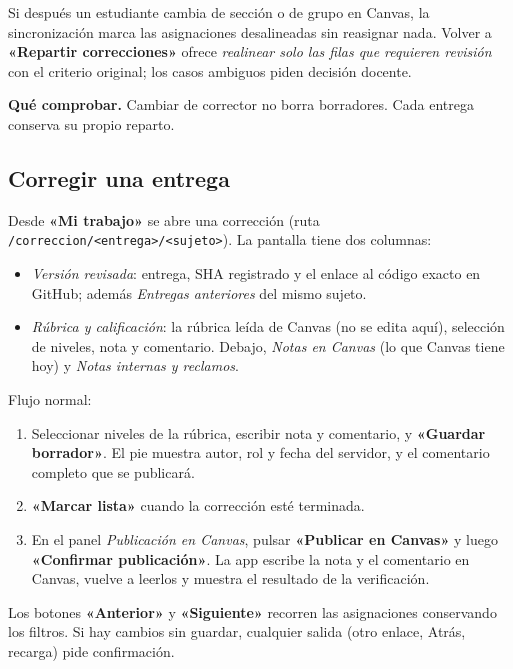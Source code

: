 \documentclass[11pt,a4paper]{article}
\newenvironment{comprobar}
  {\def\FrameCommand{\fcolorbox{verde}{verdefondo}}\MakeFramed{\advance\hsize-\width\FrameRestore}\noindent\textbf{\textcolor{verde}{Qué comprobar.}} }
  {\endMakeFramed}
\newcommand{\ui}[1]{\textbf{«#1»}}        %
\newcommand{\ruta}[1]{\texttt{#1}}        %
\begin{document}
Si después un estudiante cambia de sección o de grupo en Canvas, la sincronización marca las asignaciones desalineadas sin reasignar nada. Volver a \ui{Repartir correcciones} ofrece \emph{realinear solo las filas que requieren revisión} con el criterio original; los casos ambiguos piden decisión docente.

\begin{comprobar}
Cambiar de corrector no borra borradores. Cada entrega conserva su propio reparto.
\end{comprobar}

\subsection{Corregir una entrega}

Desde \ui{Mi trabajo} se abre una corrección (ruta \ruta{/correccion/<entrega>/<sujeto>}). La pantalla tiene dos columnas:

\begin{itemize}
  \item \emph{Versión revisada}: entrega, SHA registrado y el enlace al código exacto en GitHub; además \emph{Entregas anteriores} del mismo sujeto.
  \item \emph{Rúbrica y calificación}: la rúbrica leída de Canvas (no se edita aquí), selección de niveles, nota y comentario. Debajo, \emph{Notas en Canvas} (lo que Canvas tiene hoy) y \emph{Notas internas y reclamos}.
\end{itemize}

Flujo normal:

\begin{enumerate}
  \item Seleccionar niveles de la rúbrica, escribir nota y comentario, y \ui{Guardar borrador}. El pie muestra autor, rol y fecha del servidor, y el comentario completo que se publicará.
  \item \ui{Marcar lista} cuando la corrección esté terminada.
  \item En el panel \emph{Publicación en Canvas}, pulsar \ui{Publicar en Canvas} y luego \ui{Confirmar publicación}. La app escribe la nota y el comentario en Canvas, vuelve a leerlos y muestra el resultado de la verificación.
\end{enumerate}

Los botones \ui{Anterior} y \ui{Siguiente} recorren las asignaciones conservando los filtros. Si hay cambios sin guardar, cualquier salida (otro enlace, Atrás, recarga) pide confirmación.
\end{document}

